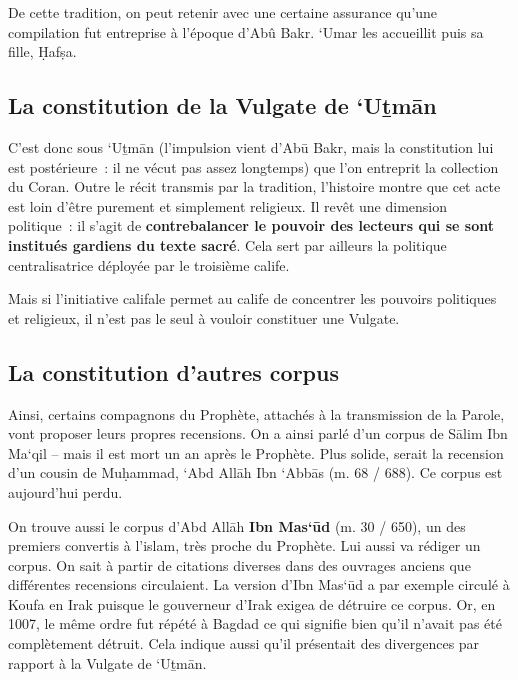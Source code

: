 De cette tradition, on peut retenir avec une certaine assurance qu'une
compilation fut entreprise à l'époque d'Abû Bakr. `Umar les accueillit
puis sa fille, Ḥafṣa.




\subsection{{La constitution de la Vulgate de `Uṯmān
}}

C'est donc sous `Uṯmān (l'impulsion vient d'Abū Bakr, mais la
constitution lui est postérieure~: il ne vécut pas assez longtemps) que
l'on entreprit la collection du Coran. Outre le récit transmis par la
tradition, l'histoire montre que cet acte est loin d'être purement et
simplement religieux. Il revêt une dimension politique~: il s'agit de
\textbf{contrebalancer le pouvoir des lecteurs qui se sont institués
gardiens du texte sacré}. Cela sert par ailleurs la politique
centralisatrice déployée par le troisième calife.

Mais si l'initiative califale permet au calife de concentrer les
pouvoirs politiques et religieux, il n'est pas le seul à vouloir
constituer une Vulgate.

 
\subsection{ La constitution d'autres corpus
} 

Ainsi, certains compagnons du Prophète, attachés à la transmission de la
Parole, vont proposer leurs propres recensions. On a ainsi parlé d'un
corpus de Sālim Ibn Ma`qil -- mais il est mort un an après le Prophète.
Plus solide, serait la recension d'un cousin de Muḥammad, `Abd Allāh Ibn
`Abbās (m. 68 / 688). Ce corpus est aujourd'hui perdu.


On trouve aussi le corpus d'Abd Allāh \textbf{Ibn Mas`ūd} (m. 30 / 650),
un des premiers convertis à l'islam, très proche du Prophète. Lui aussi
va rédiger un corpus. On sait à partir de citations diverses dans des
ouvrages anciens que différentes recensions circulaient. La version
d'Ibn Mas`ūd a par exemple circulé à Koufa en Irak puisque le gouverneur
d'Irak exigea de détruire ce corpus. Or, en 1007, le même ordre fut
répété à Bagdad ce qui signifie bien qu'il n'avait pas été complètement
détruit. Cela indique aussi qu'il présentait des divergences par rapport
à la Vulgate de `Uṯmān.

